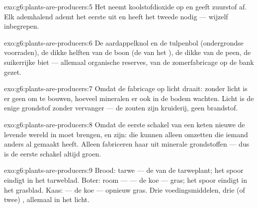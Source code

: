 \begin{solution}{exo:g6:plants-are-producers:5}
Het neemt koolstofdioxide op en geeft zuurstof af. Elk ademhalend  ademt het eerste uit en heeft het tweede nodig --- wijzelf
inbegrepen.
\end{solution}

\begin{solution}{exo:g6:plants-are-producers:6}
De aardappelknol en de tulpenbol (ondergrondse voorraden), de dikke
helften van de boon (de  van het ), de dikke 
van de peen, de suikerrijke biet --- allemaal organische reserves, van de
zomerfabricage op de bank gezet.
\end{solution}

\begin{solution}{exo:g6:plants-are-producers:7}
Omdat de fabricage op licht draait: zonder licht is er geen  om
 te bouwen, hoeveel mineralen er ook in de bodem
wachten. Licht is de enige grondstof zonder vervanger --- de zouten zijn
kruiderij, geen brandstof.
\end{solution}

\begin{solution}{exo:g6:plants-are-producers:8}
Omdat de eerste schakel van een keten nieuwe  de
levende wereld in moet brengen, en   zijn: die kunnen
alleen  omzetten die iemand anders al gemaakt heeft.
Alleen  fabriceren haar uit minerale grondstoffen --- dus is
de eerste schakel altijd groen.
\end{solution}

\begin{solution}{exo:g6:plants-are-producers:9}
Brood: tarwe --- de  van de tarweplant; het spoor eindigt in het
tarweblad. Boter: room ---  --- de koe --- gras; het spoor eindigt in
het grasblad. Kaas:  --- de koe --- opnieuw gras. Drie
voedingsmiddelen, drie (of twee) , allemaal in het licht.
\end{solution}

